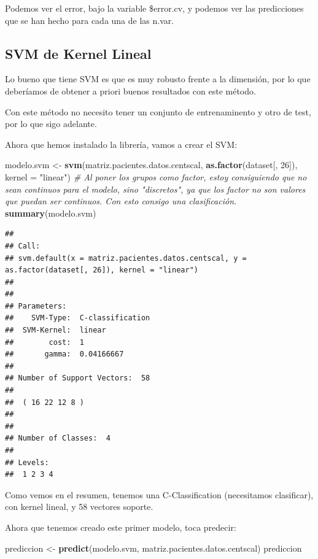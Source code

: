 \documentclass[]{article}
\newenvironment{Shaded}{\begin{snugshade}}{\end{snugshade}}
\newcommand{\KeywordTok}[1]{\textcolor[rgb]{0.13,0.29,0.53}{\textbf{#1}}}
\newcommand{\DataTypeTok}[1]{\textcolor[rgb]{0.13,0.29,0.53}{#1}}
\newcommand{\DecValTok}[1]{\textcolor[rgb]{0.00,0.00,0.81}{#1}}
\newcommand{\StringTok}[1]{\textcolor[rgb]{0.31,0.60,0.02}{#1}}
\newcommand{\CommentTok}[1]{\textcolor[rgb]{0.56,0.35,0.01}{\textit{#1}}}
\newcommand{\NormalTok}[1]{#1}
\begin{document}
Podemos ver el error, bajo la variable \$error.cv, y podemos ver las
predicciones que se han hecho para cada una de las n.var.

\subsection{SVM de Kernel Lineal}\label{svm-de-kernel-lineal}

Lo bueno que tiene SVM es que es muy robusto frente a la dimensión, por
lo que deberíamos de obtener a priori buenos resultados con este método.

Con este método no necesito tener un conjunto de entrenaminento y otro
de test, por lo que sigo adelante.

Ahora que hemos instalado la librería, vamos a crear el SVM:

\begin{Shaded}
\begin{Highlighting}[]
\NormalTok{modelo.svm <-}\StringTok{ }\KeywordTok{svm}\NormalTok{(matriz.pacientes.datos.centscal, }\KeywordTok{as.factor}\NormalTok{(dataset[, }\DecValTok{26}\NormalTok{]), }\DataTypeTok{kernel =} \StringTok{"linear"}\NormalTok{) }\CommentTok{# Al poner los grupos como factor, estoy consiguiendo que no sean continuos para el modelo, sino "discretos", ya que los factor no son valores que puedan ser continuos. Con esto consigo una clasificación.}
\KeywordTok{summary}\NormalTok{(modelo.svm)}
\end{Highlighting}
\end{Shaded}

\begin{verbatim}
## 
## Call:
## svm.default(x = matriz.pacientes.datos.centscal, y = as.factor(dataset[, 26]), kernel = "linear")
## 
## 
## Parameters:
##    SVM-Type:  C-classification 
##  SVM-Kernel:  linear 
##        cost:  1 
##       gamma:  0.04166667 
## 
## Number of Support Vectors:  58
## 
##  ( 16 22 12 8 )
## 
## 
## Number of Classes:  4 
## 
## Levels: 
##  1 2 3 4
\end{verbatim}

Como vemos en el resumen, tenemos una C-Classification (necesitamos
clasificar), con kernel lineal, y 58 vectores soporte.

Ahora que tenemos creado este primer modelo, toca predecir:

\begin{Shaded}
\begin{Highlighting}[]
\NormalTok{prediccion <-}\StringTok{ }\KeywordTok{predict}\NormalTok{(modelo.svm, matriz.pacientes.datos.centscal)}
\NormalTok{prediccion}
\end{Highlighting}
\end{Shaded}
\end{document}
